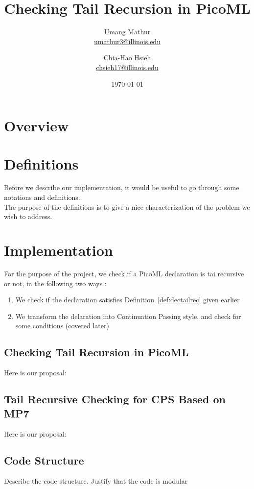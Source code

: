 \documentclass{article}
\title{Checking Tail Recursion in PicoML}
\author{Umang Mathur \\ \href{mailto:umathur3@illinois.edu}{umathur3@illinois.edu}
\and Chia-Hao Hsieh \\ \href{mailto:chsieh17@illinois.edu}{chsieh17@illinois.edu}}
\date{\today}
\begin{document}
\maketitle

\section{Overview}



\newpage

\section{Definitions}
Before we describe our implementation, it would be useful to go through some notations and definitions.\\
The purpose of the definitions is to give a nice characterization of the problem we wish to address.\\



\newpage 
\section{Implementation}
For the purpose of the project, we check if a PicoML declaration is  tai recursive or not, in the following two ways :

\begin{enumerate}
 \item We check if the declaration satisfies Definition~\ref{def:dectailrec} given earlier
 \item We transform the delaration into Continuation Passing style, and check for some conditions (covered later)
\end{enumerate}

\subsection{Checking Tail Recursion in PicoML}



Here is our proposal:

\subsection{Tail Recursive Checking for CPS Based on MP7}

Here is our proposal:

\subsection{Code Structure}
Describe the code structure.
Justify that the code is modular
\end{document}
